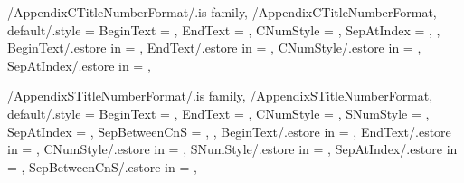 
\pgfkeys
{
  /AppendixCTitleNumberFormat/.is family, /AppendixCTitleNumberFormat,
  default/.style =
  {
    BeginText = \empty,
    EndText = \empty,
    CNumStyle = \empty,
    SepAtIndex = \empty,
  },
  BeginText/.estore in = \GetAppendixCTitleNumberFormatBeginText,
  EndText/.estore in = \GetAppendixCTitleNumberFormatEndText,
  CNumStyle/.estore in = \GetAppendixCTitleNumberFormatCNumStyle,
  SepAtIndex/.estore in = \GetAppendixCTitleNumberFormatSepAtIndex,
} %

\newcommand\GetAppendixChapterTitleNumberFormatString{}
\newcommand\SetupAppendixChapterTitleNumberFormatString
{%
  \SetupTitleNumberFormatString{Chapter}%
  {%
    BeginText=\GetAppendixCTitleNumberFormatBeginText,%
    EndText=\GetAppendixCTitleNumberFormatEndText,%
    CNumStyle=\GetAppendixCTitleNumberFormatCNumStyle,%
    CCounterName=appendixchapter,%
  }{\GetAppendixChapterTitleNumberFormatString}%
} %


\pgfkeys
{
  /AppendixSTitleNumberFormat/.is family, /AppendixSTitleNumberFormat,
  default/.style =
  {
    BeginText = \empty,
    EndText = \empty,
    CNumStyle = \empty,
    SNumStyle = \empty,
    SepAtIndex = \empty, %
    SepBetweenCnS = \empty, %
  },
  BeginText/.estore in = \GetAppendixSTitleNumberFormatBeginText,
  EndText/.estore in = \GetAppendixSTitleNumberFormatEndText,
  CNumStyle/.estore in = \GetAppendixSTitleNumberFormatCNumStyle,
  SNumStyle/.estore in = \GetAppendixSTitleNumberFormatSNumStyle,
  SepAtIndex/.estore in = \GetAppendixSTitleNumberFormatSepAtIndex,
  SepBetweenCnS/.estore in = \GetAppendixSTitleNumberFormatSepBetweenCnS,
} %

\newcommand\GetAppendixSectionTitleNumberFormatString{}
\newcommand\SetupAppendixSectionTitleNumberFormatString
{%
  \SetupTitleNumberFormatString{AppendixSection}%
  {%
    BeginText=\GetAppendixSTitleNumberFormatBeginText,%
    EndText=\GetAppendixSTitleNumberFormatEndText,%
    CNumStyle=\GetAppendixSTitleNumberFormatCNumStyle,%
    SNumStyle=\GetAppendixSTitleNumberFormatSNumStyle,%
    SepAtIndex=\GetAppendixSTitleNumberFormatSepAtIndex,%
    SepBetweenCnS=\GetAppendixSTitleNumberFormatSepBetweenCnS,%
    CCounterName=appendixchapter,%
    SCounterName=appendixsection,%
  }{\GetAppendixSectionTitleNumberFormatString}%
} %

